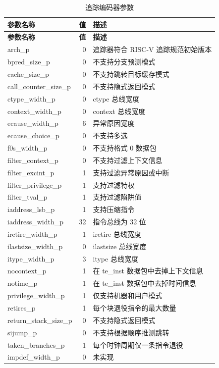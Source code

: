 \documentclass[main\_\_CN.tex]{subfiles}
\begin{document}
\begin{longtable}[c]{ |l|r|l| }
    \caption{追踪编码器参数}
    \label{tab:encoder_parameters}
    \\\hline
    \rowcolor{lightgray}
    \textbf{参数名称} & \textbf{值} & \textbf{描述} \\\hline
    \endfirsthead

    \hline
    \rowcolor{lightgray}
    \textbf{参数名称} & \textbf{值} & \textbf{描述} \\\hline
    \endhead
    \endfoot
    \endlastfoot

    arch\_p & 0 & 追踪器符合 RISC-V 追踪规范初始版本  \\\hline
    bpred\_size\_p & 0 & 不支持分支预测模式 \\\hline
    cache\_size\_p & 0 & 不支持跳转目标缓存模式 \\\hline
    call\_counter\_size\_p & 0 & 不支持隐式返回模式 \\\hline
    ctype\_width\_p & 0 & ctype 总线宽度 \\\hline
    context\_width\_p & 0 & context 总线宽度 \\\hline
    ecause\_width\_p & 6 & 异常原因宽度 \\\hline
    ecause\_choice\_p & 0 & 不支持多选 \\\hline
    f0s\_width\_p & 0 & 不支持格式 0 数据包 \\\hline
    filter\_context\_p & 0 & 不支持过滤上下文信息 \\\hline
    filter\_excint\_p & 1 & 支持过滤异常原因或中断 \\\hline
    filter\_privilege\_p & 1 & 支持过滤特权 \\\hline
    filter\_tval\_p & 1 & 支持过滤陷阱值 \\\hline
    iaddress\_lsb\_p & 1 & 支持压缩指令 \\\hline
    iaddress\_width\_p & 32 & 指令总线为 32 位 \\\hline
    iretire\_width\_p & 1 & iretire 总线宽度 \\\hline
    ilastsize\_width\_p & 0 & ilastsize 总线宽度 \\\hline
    itype\_width\_p & 3 & itype 总线宽度  \\\hline
    nocontext\_p & 1 & 在 te\_inst 数据包中去掉上下文信息 \\\hline
    notime\_p & 1 & 在 te\_inst 数据包中去掉时间信息 \\\hline
    privilege\_width\_p & 1 & 仅支持机器和用户模式 \\\hline
    retires\_p & 1 & 每个块退役指令的最大数量 \\\hline
    return\_stack\_size\_p & 0 & 不支持隐式返回模式 \\\hline
    sijump\_p & 0 & 不支持根据顺序推测跳转 \\\hline
    taken\_branches\_p & 1 & 每个时钟周期仅一条指令退役 \\\hline
    impdef\_width\_p & 0 & 未实现 \\\hline

 \end{longtable}
\end{document}
